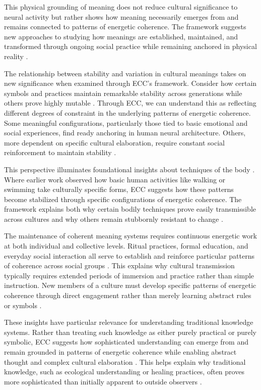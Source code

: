 This physical grounding of meaning does not reduce cultural significance to neural activity but rather shows how meaning necessarily emerges from and remains connected to patterns of energetic coherence. The framework suggests new approaches to studying how meanings are established, maintained, and transformed through ongoing social practice while remaining anchored in physical reality \cite{csordas1990embodiment}.

The relationship between stability and variation in cultural meanings takes on new significance when examined through ECC's framework. Consider how certain symbols and practices maintain remarkable stability across generations while others prove highly mutable \cite{sperber1996explaining}. Through ECC, we can understand this as reflecting different degrees of constraint in the underlying patterns of energetic coherence. Some meaningful configurations, particularly those tied to basic emotional and social experiences, find ready anchoring in human neural architecture. Others, more dependent on specific cultural elaboration, require constant social reinforcement to maintain stability \cite{boyer1994naturalness}.

This perspective illuminates foundational insights about techniques of the body \cite{bourdieu1990logic}. Where earlier work observed how basic human activities like walking or swimming take culturally specific forms, ECC suggests how these patterns become stabilized through specific configurations of energetic coherence. The framework explains both why certain bodily techniques prove easily transmissible across cultures and why others remain stubbornly resistant to change \cite{ingold2000perception}.

The maintenance of coherent meaning systems requires continuous energetic work at both individual and collective levels. Ritual practices, formal education, and everyday social interaction all serve to establish and reinforce particular patterns of coherence across social groups \cite{hutchins1995cognition}. This explains why cultural transmission typically requires extended periods of immersion and practice rather than simple instruction. New members of a culture must develop specific patterns of energetic coherence through direct engagement rather than merely learning abstract rules or symbols \cite{tomasello1999cultural}.

These insights have particular relevance for understanding traditional knowledge systems. Rather than treating such knowledge as either purely practical or purely symbolic, ECC suggests how sophisticated understanding can emerge from and remain grounded in patterns of energetic coherence while enabling abstract thought and complex cultural elaboration \cite{varela1991embodied}. This helps explain why traditional knowledge, such as ecological understanding or healing practices, often proves more sophisticated than initially apparent to outside observers \cite{jackson1996things}.

